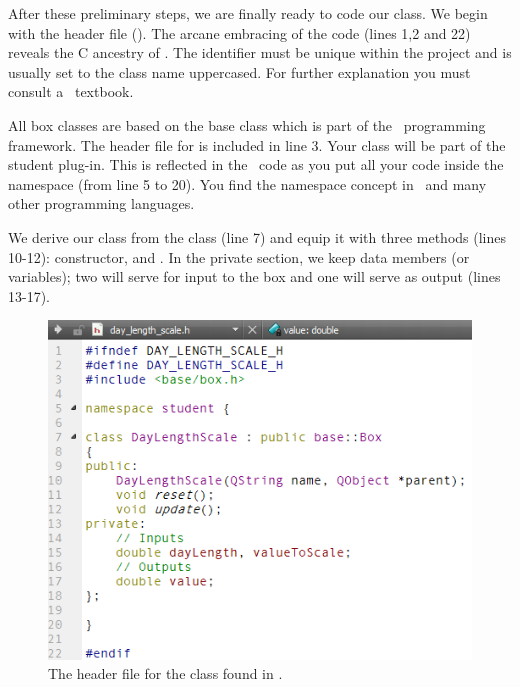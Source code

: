 After these preliminary steps, we are finally ready to code our  class. We begin with the header file (). The arcane embracing of the code (lines 1,2 and 22) reveals the C ancestry of \CPP. The identifier  must be unique within the project and is usually set to the class name uppercased. For further explanation you must consult a \CPP\ textbook.

All box classes are based on the  base class which is part of the \US\ programming framework. The header file for  is included in line 3. Your class will be part of the student plug-in. This is reflected in the \CPP\ code as you put all your code inside the  namespace (from line 5 to 20). You find the namespace concept in \CPP\ and many other programming languages.

We derive our  class from the  class (line 7) and equip it with three methods (lines 10-12): constructor,  and . In the private section, we keep data members (or variables); two will serve for input to the box and one will serve as output (lines 13-17).

\begin{figure}
\centering
\includegraphics[scale=0.7]{graphics/qt-creator-day-length-scale-h}
\caption{The header file for the  class found in .}
\label{fig:qt-creator-day-length-scale-h}
\end{figure}

